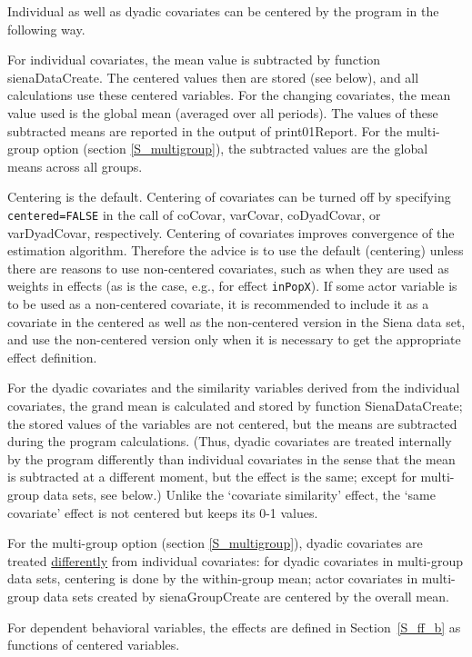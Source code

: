 \documentclass[a4paper,fleqn,11pt]{article}
\newcommand{\+}{\, + \,}
\newcommand{\sfn}[1]{\textsf{#1}}
\begin{document}
Individual as well as dyadic covariates can be centered
by the program in the following way.

For individual covariates, the mean value is subtracted
by function \textsf{sienaDataCreate}. The centered values then are stored
(see below),
and all calculations use these centered variables.
For the changing covariates, the mean
value used is the global mean (averaged over all periods).
The values of these subtracted means are reported in the output
of \sfn{print01Report}.
For the multi-group option (section \ref{S_multigroup}),
the subtracted values are the global means across all groups.

Centering is the default.
Centering of covariates can be turned off by specifying
\texttt{centered=FALSE} in the call of \sfn{coCovar},
\sfn{varCovar}, \sfn{coDyadCovar}, or \sfn{varDyadCovar}, respectively.
Centering of covariates improves
convergence of the estimation algorithm.
Therefore the advice is to use the default (centering) unless there are reasons to
use non-centered covariates, such as when they are used as weights in effects
(as is the case, e.g., for effect \texttt{inPopX}).
If some actor variable is to be used as a non-centered covariate,
it is recommended to include it as a covariate in the centered
as well as the non-centered version in the Siena data set,
and use the non-centered version only when it is necessary
to get the appropriate effect definition.

For the dyadic covariates and the similarity variables derived
from the individual covariates, the grand mean is calculated
and stored by function \sfn{SienaDataCreate};
the stored values of the variables are not centered, but the means
are subtracted during the program calculations. (Thus,
dyadic covariates are treated internally by the program differently than
individual covariates in the sense that the mean is subtracted at
a different moment, but the effect is the same; except for multi-group
data sets, see below.)
Unlike the `covariate similarity' effect,
the `same covariate' effect is not centered but keeps its 0-1 values.

For the multi-group option (section \ref{S_multigroup}),
dyadic covariates are treated \underline{differently} from
individual covariates:
for dyadic covariates in multi-group data sets, centering is done by the
within-group mean;
actor covariates in multi-group data sets  created by \sfn{sienaGroupCreate}
are centered by the overall mean.

For dependent behavioral variables, the effects are defined
in Section~\ref{S_ff_b} as functions of centered variables.
\end{document}
